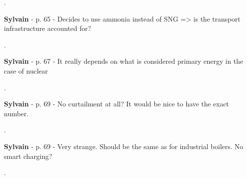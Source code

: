 \documentclass[12pt,a4paper]{article}
\begin{document}
\noindent {\color{blue} }. 

\begin{mdframed}[style=manuscript] %

\end{mdframed}

\begin{mdframed}[style=comment] %
{\color{purple} \textbf{Sylvain}} - p. 65 - Decides to use ammonia instead of SNG => is the transport infrastructure accounted for?
\end{mdframed}

\noindent {\color{blue} }. 

\begin{mdframed}[style=manuscript] %

\end{mdframed}

\begin{mdframed}[style=comment] %
{\color{purple} \textbf{Sylvain}} - p. 67 - It really depends on what is considered primary energy in the case of nuclear
\end{mdframed}

\noindent {\color{blue} }. 

\begin{mdframed}[style=manuscript] %

\end{mdframed}

\begin{mdframed}[style=comment] %
{\color{purple} \textbf{Sylvain}} - p. 69 - No curtailment at all? It would be nice to have the exact number.
\end{mdframed}

\noindent {\color{blue} }. 

\begin{mdframed}[style=manuscript] %

\end{mdframed}

\begin{mdframed}[style=comment] %
{\color{purple} \textbf{Sylvain}} - p. 69 - Very strange. Should be the same as for industrial boilers. No smart charging?
\end{mdframed}

\noindent {\color{blue} }. 
\end{document}
